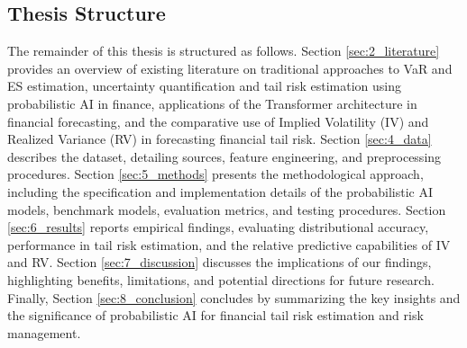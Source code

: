 \begin{comment}
    \item Something something about testing the models developed by Utne et al on a different asset class as well as rewriting them for multi-asset forecasting. 
    \item Something something about testing the efficacy og IV and RV and combuination for tail risk estimation
    \item Something something integrate with the benchmarking point about testing several ML models 
    \item Something something only article to test prob AI models on ES estimate
    \item IV in ES prediction more or less not done

\end{enumerate}

These contributions significantly advance academic research by addressing key gaps in the literature related to the use of probabilistic AI for distributional forecasting and tail risk estimation in financial time series analysis.

\end{comment}

\subsection{Thesis Structure}
\label{sec:thesis_structure}

The remainder of this thesis is structured as follows. Section \ref{sec:2_literature} provides an overview of existing literature on traditional approaches to VaR and ES estimation, uncertainty quantification and tail risk estimation using probabilistic AI in finance, applications of the Transformer architecture in financial forecasting, and the comparative use of Implied Volatility (IV) and Realized Variance (RV) in forecasting financial tail risk. Section \ref{sec:4_data} describes the dataset, detailing sources, feature engineering, and preprocessing procedures. Section \ref{sec:5_methods} presents the methodological approach, including the specification and implementation details of the probabilistic AI models, benchmark models, evaluation metrics, and testing procedures. Section \ref{sec:6_results} reports empirical findings, evaluating distributional accuracy, performance in tail risk estimation, and the relative predictive capabilities of IV and RV. Section \ref{sec:7_discussion} discusses the implications of our findings, highlighting benefits, limitations, and potential directions for future research. Finally, Section \ref{sec:8_conclusion} concludes by summarizing the key insights and the significance of probabilistic AI for financial tail risk estimation and risk management.